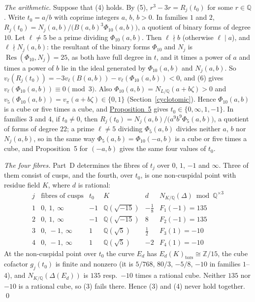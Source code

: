 \documentclass[11pt]{article}
\newcommand{\Q}{\mathbb Q}
\newcommand{\Z}{\mathbb Z}
\DeclareMathOperator{\Res}{Res}
\begin{document}
\emph{The arithmetic.} Suppose that (4) holds. By (5), \(r^3-3r=R_j(t_0)\) for some \(r\in\Q\). Write
\(t_0=a/b\) with coprime integers \(a\), \(b\), \(b>0\). In families \(1\) and \(2\),
\(R_j(t_0)=N_j(a,b)/\bigl(B(a,b)^3\Phi_{10}(a,b)\bigr)\), a quotient of binary forms of degree \(10\).
Let \(\ell\neq5\) be a prime dividing \(\Phi_{10}(a,b)\). Then \(\ell\nmid b\) (otherwise \(\ell\mid a\)),
and \(\ell\nmid N_j(a,b)\): the resultant of the binary forms \(\Phi_{10}\) and \(N_j\) is
\(\Res(\Phi_{10},N_j)=25\), as both have full degree in \(t\), and it times a power of \(a\) and times
a power of \(b\) lie in the ideal generated by \(\Phi_{10}(a,b)\) and \(N_j(a,b)\). So \(v_\ell(R_j(t_0))=-3v_\ell(B(a,b))-v_\ell(\Phi_{10}(a,b))<0\), and (6) gives
\(v_\ell(\Phi_{10}(a,b))\equiv0\pmod3\). Also \(\Phi_{10}(a,b)=N_{L/\Q}(a+b\zeta)>0\) and
\(v_5(\Phi_{10}(a,b))=v_\pi(a+b\zeta)\in\{0,1\}\) (Section~\ref{cyclotomic}). Hence \(\Phi_{10}(a,b)\) is
a cube or five times a cube, and \hyperref[prop-cyclo]{Proposition~5} gives
\(t_0\in\{0,\infty,1,-1\}\). In families \(3\) and \(4\), if \(t_0\neq0\), then
\(R_j(t_0)=N_j(a,b)/\bigl(a^9b^9\Phi_5(a,b)\bigr)\), a quotient of forms of degree \(22\); a prime
\(\ell\neq5\) dividing \(\Phi_5(a,b)\) divides neither \(a\), \(b\) nor \(N_j(a,b)\), so in the same way
\(\Phi_5(a,b)=\Phi_{10}(-a,b)\) is a cube or five times a cube, and Proposition~5 for \((-a,b)\) gives
the same four values of \(t_0\).

\emph{The four fibres.} Part~D determines the fibres of \(t_j\) over \(0\), \(1\), \(-1\) and
\(\infty\). Three of them consist of cusps, and the fourth, over \(t_0\), is one non-cuspidal point
with residue field \(K\), where \(d\) is rational:
\[\begin{array}{c|c|c|c|c|c}
j&\text{fibres of cusps}&t_0&K&d&N_{K/\Q}(\Delta)\bmod\Q^{\times3}\\\hline
1&0,\ 1,\ \infty&-1&\Q(\sqrt{-15})&-\tfrac18&F_1(-1)=135\\
2&0,\ 1,\ \infty&-1&\Q(\sqrt{-15})&8&F_2(-1)=135\\
3&0,\ -1,\ \infty&1&\Q(\sqrt5)&\tfrac12&F_3(1)=-10\\
4&0,\ -1,\ \infty&1&\Q(\sqrt5)&-2&F_4(1)=-10
\end{array}\]
At the non-cuspidal point over \(t_0\) the curve \(E_d\) has \(E_d(K)_{\mathrm{tors}}\cong\Z/15\), the
cube cofactor \(g_j(t_0)\) is finite and nonzero (it is \(5/768\), \(80/3\), \(-5/8\), \(-10\) in
families \(1\)--\(4\)), and \(N_{K/\Q}(\Delta(E_d))\) is \(135\) resp.~\(-10\) times a rational cube.
Neither \(135\) nor \(-10\) is a rational cube, so (3) fails there. Hence (3) and (4) never hold
together. \qed
\end{document}
